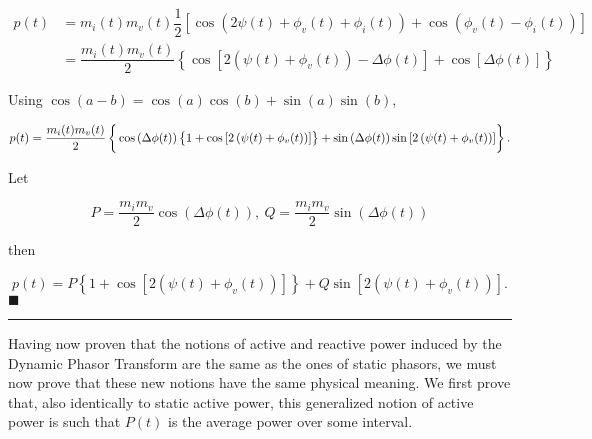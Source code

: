 \begin{align} p(t) &= m_i(t) m_v(t) \dfrac{1}{2} \left[ \cos\left(2\psi(t) + \phi_v(t) + \phi_i(t)\right) + \cos\left(\phi_v(t) - \phi_i(t)\right)\right] \nonumber\\[3mm] &= \dfrac{m_i(t) m_v(t)}{2} \left\{\cos\left[2\left(\psi(t) + \phi_v(t)\right) - \Delta\phi(t)\right] + \cos\left[\Delta\phi(t)\right]\right\} \end{align}

	Using $\cos(a-b) = \cos(a)\cos(b) + \sin(a)\sin(b)$,

\begin{equation} p(t) = \dfrac{m_i(t) m_v(t)}{2} \left\{\raisebox{5mm}{} \cos\left(\Delta\phi(t)\right)\left\{\raisebox{3mm}{} 1 + \cos\left[2\left(\psi(t) + \phi_v(t)\right)\right]\right\} + \sin\left(\Delta\phi(t)\right)\sin\left[2\left(\psi(t) + \phi_v(t)\right)\right] \right\} . \label{eq:nonst_complex_apparent_power_eq1} \end{equation}

	Let

\begin{equation} P = \dfrac{m_i m_v}{2} \cos\left(\Delta\phi(t)\right),\ Q = \dfrac{m_i m_v}{2} \sin\left(\Delta\phi(t)\right) \end{equation}

	\noindent then

\begin{equation} p(t) = P\left\{1 + \cos\left[2\left(\psi(t) + \phi_v(t)\right) \right]\right\} + Q\sin\left[2\left(\psi(t) + \phi_v(t) \right)\right] . \label{eq:nononst_complex_apparent_power_eq2} \end{equation}
\hfill$\blacksquare$
\vspace{5mm}
\hrule
\vspace{5mm} %

	Having now proven that the notions of active and reactive power induced by the Dynamic Phasor Transform are the same as the ones of static phasors, we must now prove that these new notions have the same physical meaning. We first prove that, also identically to static active power, this generalized notion of active power is such that $P(t)$ is the average power over some interval.

